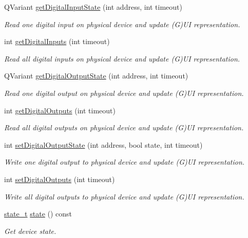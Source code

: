 \begin{DoxyCompactItemize}
QVariant \hyperlink{classmdt_device_aad589d5c8c769299fdf0ea4e34d3bc0a}{getDigitalInputState} (int address, int timeout)
\begin{DoxyCompactList}\small\item\em Read one digital input on physical device and update (G)UI representation. \end{DoxyCompactList}\item 
int \hyperlink{classmdt_device_ae482b28263b2ce61735f42f1245c1e99}{getDigitalInputs} (int timeout)
\begin{DoxyCompactList}\small\item\em Read all digital inputs on physical device and update (G)UI representation. \end{DoxyCompactList}\item 
QVariant \hyperlink{classmdt_device_a719401fec13501047ffdf7f51583937c}{getDigitalOutputState} (int address, int timeout)
\begin{DoxyCompactList}\small\item\em Read one digital output on physical device and update (G)UI representation. \end{DoxyCompactList}\item 
int \hyperlink{classmdt_device_a6bd6ad4f8d07121dd8b988594927e9c8}{getDigitalOutputs} (int timeout)
\begin{DoxyCompactList}\small\item\em Read all digital outputs on physical device and update (G)UI representation. \end{DoxyCompactList}\item 
int \hyperlink{classmdt_device_a702a5f49680b03f04a9f58ae6906bf83}{setDigitalOutputState} (int address, bool state, int timeout)
\begin{DoxyCompactList}\small\item\em Write one digital output to physical device and update (G)UI representation. \end{DoxyCompactList}\item 
int \hyperlink{classmdt_device_ae68a400d5f27fe142d41b674f473bf98}{setDigitalOutputs} (int timeout)
\begin{DoxyCompactList}\small\item\em Write all digital outputs to physical device and update (G)UI representation. \end{DoxyCompactList}\item 
\hypertarget{classmdt_device_afde11f7cb1d6a932db3824011f7ccccc}{
\hyperlink{classmdt_device_a39c301b1fda803dba0c9ab98164a9d1e}{state\_\-t} \hyperlink{classmdt_device_afde11f7cb1d6a932db3824011f7ccccc}{state} () const }
\label{classmdt_device_afde11f7cb1d6a932db3824011f7ccccc}

\begin{DoxyCompactList}\small\item\em Get device state. \end{DoxyCompactList}\end{DoxyCompactItemize}
